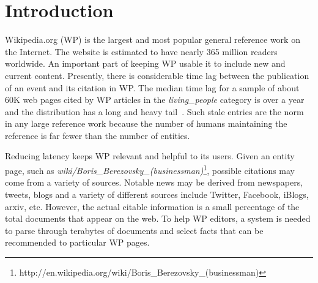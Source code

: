 
\section{Introduction}

Wikipedia.org (WP) is the largest and most popular general reference work on the Internet.
The website is estimated to have nearly 365 million readers worldwide.
An important part of keeping WP usable it to include new and current content.
Presently, there is considerable time lag between the publication of an event and its citation in WP\@.
The median time lag for a sample of about 60K web pages cited by WP articles in the \textit{living\_people} category is over a year and the distribution has a long and heavy tail~\cite{JFrank12}.
Such stale entries are the norm in any large reference work because the number
of humans maintaining the reference is far fewer than the number of entities.

Reducing latency keeps WP relevant and helpful to its users.
Given an entity page, such as \textsl{wiki/Boris\_Berezovsky\_(businessman)}\footnote{http://en.wikipedia.org/wiki/Boris\_Berezovsky\_(businessman)},
possible citations may come from a variety of sources.
Notable news may be derived from newspapers, tweets, blogs and a variety of
different sources include Twitter, Facebook, iBlogs, arxiv, etc.
However, the actual citable information is a small percentage of the total documents that appear on the web.
To help WP editors, a system is needed to parse through terabytes of documents 
and select facts that can be recommended to particular WP pages.


